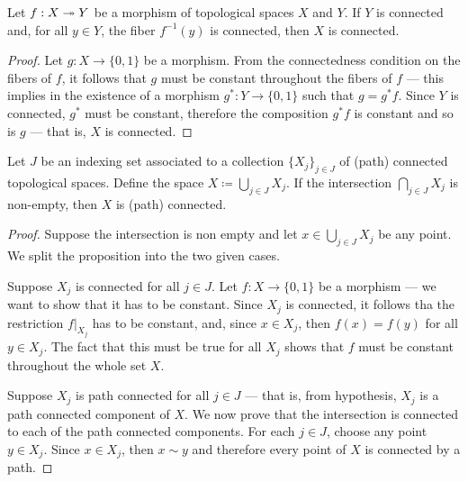\begin{proposition}
\label{prop:connectivity-quotients}
Let \(f: X \twoheadrightarrow Y\) be a morphism of topological spaces \(X\) and \(Y\). If
\(Y\) is connected and, for all \(y \in Y\), the fiber \(f^{-1}(y)\) is
connected, then \(X\) is connected.
\end{proposition}

\begin{proof}
Let \(g: X \to \{0, 1\}\) be a morphism. From the connectedness condition on the
fibers of \(f\), it follows that \(g\) must be constant throughout the fibers of
\(f\) --- this implies in the existence of a morphism \(g^{*}: Y \to \{0, 1\}\)
such that \(g = g^{*} f\). Since \(Y\) is connected, \(g^{*}\) must be constant,
therefore the composition \(g^{*} f\) is constant and so is \(g\) --- that is,
\(X\) is connected.
\end{proof}

\begin{proposition}
\label{prop:union-path-connected}
Let \(J\) be an indexing set associated to a collection \(\{X_{j}\}_{j \in J}\)
of (path) connected topological spaces. Define the space \(X \coloneq \bigcup_{j
\in J} X_j\). If the intersection \(\bigcap_{j \in J} X_j\) is non-empty, then
\(X\) is (path) connected.
\end{proposition}

\begin{proof}
Suppose the intersection is non empty and let \(x \in \bigcup_{j \in J}
X_j\) be any point. We split the proposition into the two given cases.

Suppose \(X_j\) is connected for all \(j \in J\). Let \(f: X \to \{0, 1\}\) be a
morphism --- we want to show that it has to be constant. Since \(X_j\) is
connected, it follows tha the restriction \(f|_{X_j}\) has to be constant, and,
since \(x \in X_j\), then \(f(x) = f(y)\) for all \(y \in X_j\). The fact that
this must be true for all \(X_j\) shows that \(f\) must be constant throughout
the whole set \(X\).

Suppose \(X_j\) is path connected for all \(j \in J\) --- that is, from
hypothesis, \(X_j\) is a path connected component of \(X\). We now prove that
the intersection is connected to each of the path connected components. For each
\(j \in J\), choose any point \(y \in X_j\). Since \(x \in X_j\), then \(x \sim
y\) and therefore every point of \(X\) is connected by a path.
\end{proof}


